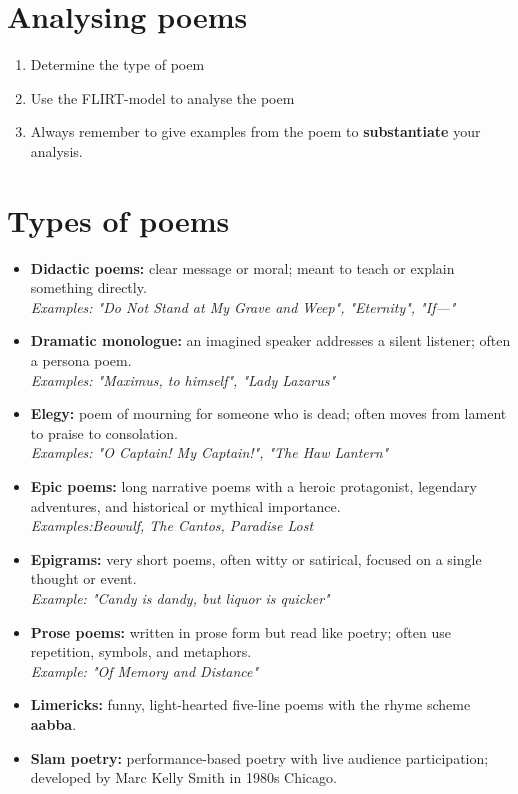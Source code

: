 \documentclass[11pt,a4paper,oneside]{book}
\begin{document}
\section*{Analysing poems}

\begin{enumerate}
\item Determine the type of poem
\item Use the FLIRT-model to analyse the poem
\item Always remember to give examples from the poem to \textbf{substantiate} your analysis.
\end{enumerate}

\section*{Types of poems}

\begin{itemize}
\item \textbf{Didactic poems:} clear message or moral; meant to teach or explain something directly.\\\emph{Examples: "Do Not Stand at My Grave and Weep", "Eternity", "If—"}
\item \textbf{Dramatic monologue:} an imagined speaker addresses a silent listener; often a persona poem.\\\emph{Examples: "Maximus, to himself", "Lady Lazarus"}
\item \textbf{Elegy:} poem of mourning for someone who is dead; often moves from lament to praise to consolation.\\\emph{Examples: "O Captain! My Captain!", "The Haw Lantern"}
\item \textbf{Epic poems:} long narrative poems with a heroic protagonist, legendary adventures, and historical or mythical importance.\\\emph{Examples:}\emph{Beowulf, The Cantos, Paradise Lost}
\item \textbf{Epigrams:} very short poems, often witty or satirical, focused on a single thought or event.\\\emph{Example: "Candy is dandy, but liquor is quicker"}
\item \textbf{Prose poems:} written in prose form but read like poetry; often use repetition, symbols, and metaphors.\\\emph{Example: "Of Memory and Distance"}
\item \textbf{Limericks:} funny, light-hearted five-line poems with the rhyme scheme \textbf{aabba}.
\item \textbf{Slam poetry:} performance-based poetry with live audience participation; developed by Marc Kelly Smith in 1980s Chicago.
\end{itemize}
\end{document}
